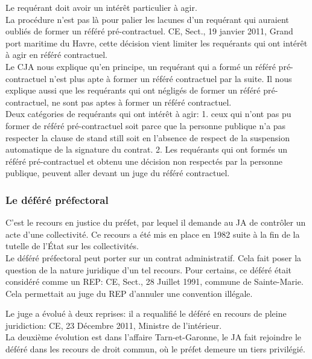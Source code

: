 \documentclass[10pt, a4paper, openany]{book}
\begin{document}
Le requérant doit avoir un intérêt particulier à agir. \\
La procédure n'est pas là pour palier les lacunes d'un requérant qui auraient oubliés de former un référé pré-contractuel. CE, Sect., 19 janvier 2011, Grand port maritime du Havre, cette décision vient limiter les requérants qui ont intérêt à agir en référé contractuel. \\
Le CJA nous explique qu'en principe, un requérant qui a formé un référé pré-contractuel n'est plus apte à former un référé contractuel par la suite. Il nous explique aussi que les requérants qui ont négligés de former un référé pré-contractuel, ne sont pas aptes à former un référé contractuel. \\
Deux catégories de requérants qui ont intérêt à agir: 1. ceux qui n'ont pas pu former de référé pré-contractuel soit parce que la personne publique n'a pas respecter la clause de stand still soit en l'absence de respect de la suspension automatique de la signature du contrat. 2. Les requérants qui ont formés un référé pré-contractuel et obtenu une décision non respectés par la personne publique, peuvent aller devant un juge du référé contractuel. 

\subsubsection{Le déféré préfectoral}

C'est le recours en justice du préfet, par lequel il demande au JA de contrôler un acte d'une collectivité. Ce recours a été mis en place en 1982 suite à la fin de la tutelle de l'État sur les collectivités. \\
Le déféré préfectoral peut porter sur un contrat administratif. Cela fait poser la question de la nature juridique d'un tel recours. Pour certains, ce déféré était considéré comme un REP: CE, Sect., 28 Juillet 1991, commune de Sainte-Marie. Cela permettait au juge du REP d'annuler une convention illégale. 


Le juge a évolué à deux reprises: il a requalifié le déféré en recours de pleine juridiction: CE, 23 Décembre 2011, Ministre de l'intérieur. \\
La deuxième évolution est dans l'affaire Tarn-et-Garonne, le JA fait rejoindre le déféré dans les recours de droit commun, où le préfet demeure un tiers privilégié.
\end{document}
